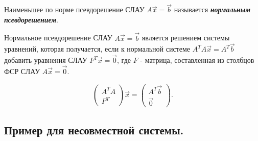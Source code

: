 \begin{definition}
    Наименьшее по норме псевдорешение СЛАУ $A\vec{x} = \vec{b}$ называется \textbf{\textit{нормальным псевдорешением}}.
\end{definition}

Нормальное псевдорешение СЛАУ $A\vec{x} = \vec{b}$ является решением системы уравнений, которая получается, если к нормальной системе $A^TA\vec{x} = A^T\vec{b}$ добавить уравнения СЛАУ $F^T\vec{x} = \vec{0}$, где $F$ - матрица, составленная из столбцов ФСР СЛАУ $A\vec{x} = \vec{0}$.

\begin{equation*}
    \left(\begin{array}{c}
        A^TA \\
        F^T
    \end{array}\right)\vec{x}
    =
    \left(\begin{array}{c}
        A^T\vec{b} \\
        \vec{0}
    \end{array}\right)
.\end{equation*}


\newpage


\subsection{
    Пример для несовместной системы.
}

